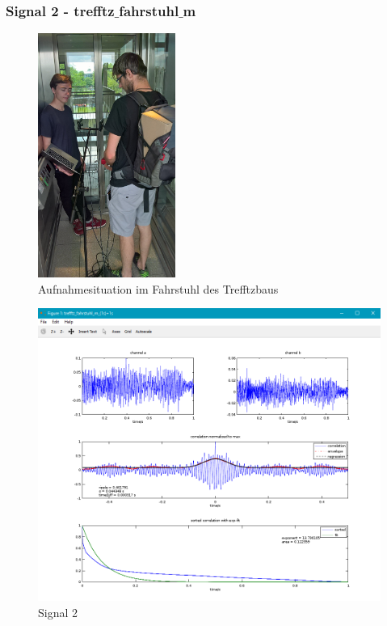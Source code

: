 \subsubsection{Signal 2 - trefftz$\_$fahrstuhl$\_$m}
\begin{figure}[ht!]
  \centering
  \includegraphics[width=0.4\textwidth]{img/fahrstuhl}
  \caption{Aufnahmesituation im Fahrstuhl des Trefftzbaus}
  \label{figure5}
\end{figure}
\begin{figure}[ht!]
  \centering
  \includegraphics[scale=0.6]{img/trefftz_fahrstuhl_m}
  \caption{Signal 2}
  \label{figure3}
\end{figure}
